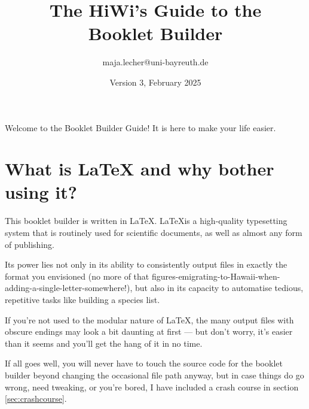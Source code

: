 \documentclass[a4paper,12pt,twoside]{article}
\title{\textbf{The HiWi's Guide to the \\Booklet Builder}}
\date{Version 3, February 2025}
\author{maja.lecher@uni-bayreuth.de}
\begin{document}
\maketitle
\newpage

Welcome to the Booklet Builder Guide! It is here to make your life easier.

\section{What is LaTeX and why bother using it?}
This booklet builder is written in \LaTeX. \LaTeX is a high-quality typesetting system that is routinely used for scientific documents, as well as almost any form of publishing. 

Its power lies not only in its ability to consistently output files in exactly the format you envisioned (no more of that figures-emigrating-to-Hawaii-when-adding-a-single-letter-somewhere!), but also in its capacity to automatise tedious, repetitive tasks like building a species list.

If you’re not used to the modular nature of \LaTeX, the many output files with obscure endings may look a bit daunting at first — but don’t worry, it’s easier than it seems and you’ll get the hang of it in no time.

If all goes well, you will never have to touch the source code for the booklet builder beyond changing the occasional file path anyway, but in case things do go wrong, need tweaking, or you’re bored, I have included a crash course in section \ref{sec:crashcourse}.
\end{document}
